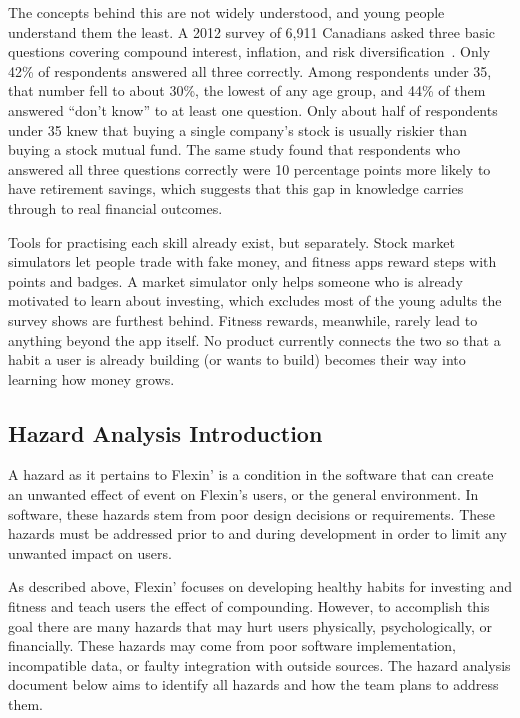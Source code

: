 \documentclass{article}
\begin{document}
The concepts behind this are not widely understood, and young people understand
them the least. A 2012 survey of 6,911 Canadians asked three basic questions
covering compound interest, inflation, and risk diversification~\cite{boisclair2017}.
Only 42\% of respondents answered all three correctly.
Among respondents under 35, that number fell to about 30\%, the lowest of any
age group, and 44\% of them answered ``don't know'' to at least one question.
Only about half of respondents under 35 knew that buying a single company's
stock is usually riskier than buying a stock mutual fund. The same study found
that respondents who answered all three questions correctly were 10 percentage
points more likely to have retirement savings, which suggests that this gap in
knowledge carries through to real financial outcomes.

Tools for practising each skill already exist, but separately. Stock market
simulators let people trade with fake money, and fitness apps reward steps with
points and badges. A market simulator only helps someone who is already
motivated to learn about investing, which excludes most of the young adults the
survey shows are furthest behind. Fitness rewards, meanwhile, rarely lead to
anything beyond the app itself. No product currently connects the two so that a
habit a user is already building (or wants to build) becomes their way into
learning how money grows.

\subsection{Hazard Analysis Introduction}

A hazard as it pertains to Flexin' is a condition in the software that can create an unwanted effect of event on Flexin's users, or the general environment.
In software, these hazards stem from poor design decisions or requirements.
These hazards must be addressed prior to and during development in order to limit any unwanted impact on users.

As described above, Flexin' focuses on developing healthy habits for investing and fitness and teach users the effect of compounding.
However, to accomplish this goal there are many hazards that may hurt users physically, psychologically, or financially.
These hazards may come from poor software implementation, incompatible data, or faulty integration with outside sources.
The hazard analysis document below aims to identify all hazards and how the team plans to address them.
\end{document}
